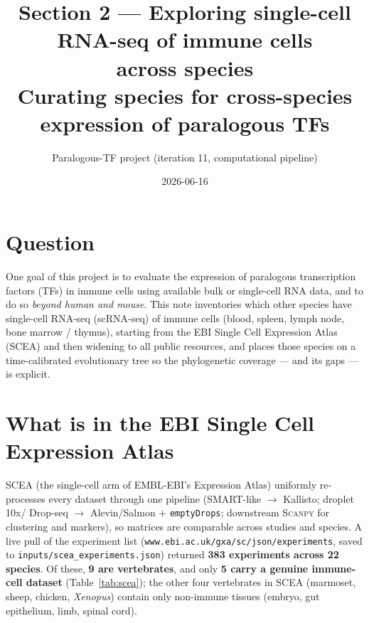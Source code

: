 \documentclass[11pt]{article}
\title{\textbf{Section 2 --- Exploring single-cell RNA-seq of immune cells\\
across species}\\[2pt]
\large Curating species for cross-species expression of paralogous TFs}
\author{Paralogous-TF project \quad (iteration 11, computational pipeline)}
\date{2026-06-16}
\begin{document}
\maketitle

\section{Question}
One goal of this project is to evaluate the expression of paralogous transcription
factors (TFs) in immune cells using available bulk or single-cell RNA data, and to
do so \emph{beyond human and mouse}. This note inventories which other species have
single-cell RNA-seq (scRNA-seq) of immune cells (blood, spleen, lymph node, bone
marrow / thymus), starting from the EBI Single Cell Expression Atlas (SCEA) and then
widening to all public resources, and places those species on a time-calibrated
evolutionary tree so the phylogenetic coverage --- and its gaps --- is explicit.

\section{What is in the EBI Single Cell Expression Atlas}
SCEA (the single-cell arm of EMBL-EBI's Expression Atlas) uniformly re-processes
every dataset through one pipeline (SMART-like $\rightarrow$ Kallisto; droplet 10x/
Drop-seq $\rightarrow$ Alevin/Salmon $+$ \texttt{emptyDrops}; downstream
\textsc{Scanpy} for clustering and markers), so matrices are comparable across
studies and species. A live pull of the experiment list
(\texttt{www.ebi.ac.uk/gxa/sc/json/experiments}, saved to
\texttt{inputs/scea\_experiments.json}) returned \textbf{383 experiments across 22
species}. Of these, \textbf{9 are vertebrates}, and only \textbf{5 carry a genuine
immune-cell dataset} (Table~\ref{tab:scea}); the other four vertebrates in SCEA
(marmoset, sheep, chicken, \emph{Xenopus}) contain only non-immune tissues
(embryo, gut epithelium, limb, spinal cord).
\end{document}
